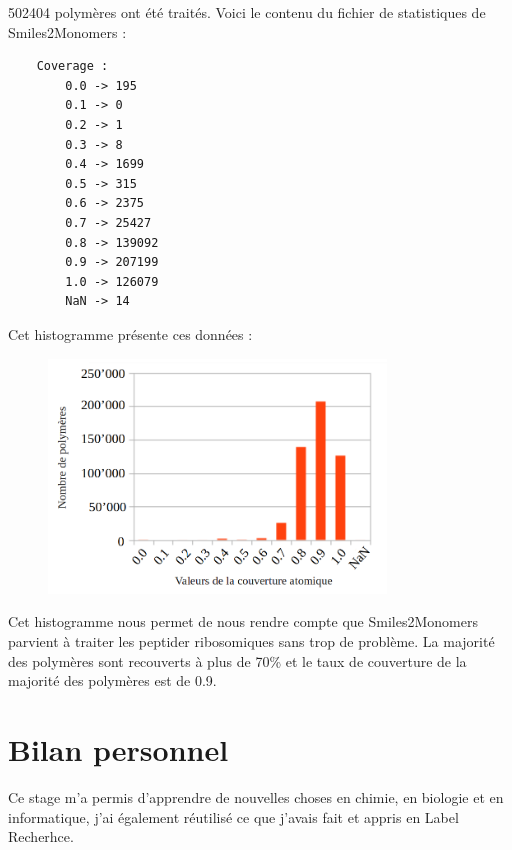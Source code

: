 \documentclass[11pt, a4paper]{report}
\begin{document}
	502404 polymères ont été traités. 
	Voici le contenu du fichier de statistiques de Smiles2Monomers :
	\lstset{language=Javascript}
	\begin{lstlisting}
	Coverage :
		0.0 -> 195
		0.1 -> 0
		0.2 -> 1
		0.3 -> 8
		0.4 -> 1699
		0.5 -> 315
		0.6 -> 2375
		0.7 -> 25427
		0.8 -> 139092
		0.9 -> 207199
		1.0 -> 126079
		NaN -> 14
	\end{lstlisting}
	\vspace{2cm}
	Cet histogramme présente ces données :
	\begin{figure}[H]
		\includegraphics[width=0.8\textwidth]{./images/ACs2m.png}
	\end{figure}
	
	Cet histogramme nous permet de nous rendre compte que Smiles2Monomers parvient à traiter les peptider ribosomiques sans trop de problème. La majorité des polymères sont recouverts à plus de 70\% et le taux de couverture de la majorité des polymères est de 0.9.
	
	
	
	
	\chapter*{Bilan personnel}
	
	Ce stage m'a permis d'apprendre de nouvelles choses en chimie, en biologie et en informatique, j'ai également réutilisé ce que j'avais fait et appris en Label Recherhce.
	
\end{document}
